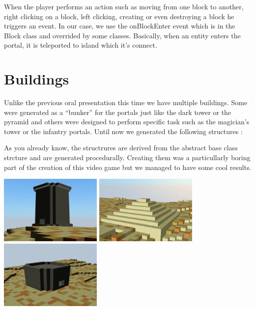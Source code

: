 \documentclass[article]{report}             %
\begin{document}
				When the player performs an action such as moving from one block to another, right clicking on a block, left clicking, creating or even destroying a block he triggers an event. In our case, we use the onBlockEnter event which is in the Block class and overrided by some classes. Basically, when an entity enters the portal, it is teleported to island which it's connect.
			\section{Buildings}  
				Unlike the previous oral presentation this time we have multiple buildings. Some were generated as a ``bunker'' for the portals just like the dark tower or the pyramid and others were designed to perform specific task such as the magician's tower or the infantry portals. Until now we generated the following structures :

				As you already know, the structrures are derived from the abstract base class strcture and are generated procedurally. Creating them was a particullarly boring part of the creation of this video game but we managed to have some cool results.\\

				\begin{center}
					\includegraphics[width=5cm]{images/structure.png}
					\includegraphics[width=5cm]{images/structure2.png}
					\includegraphics[width=5cm]{images/structure3.png}
				\end{center}
\end{document}

